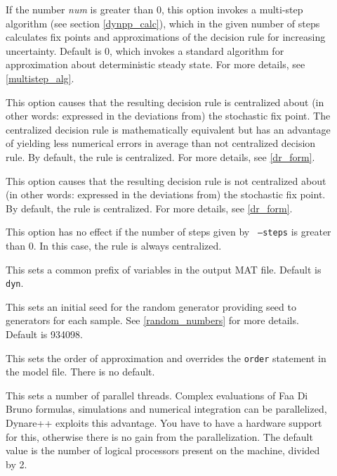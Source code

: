 \documentclass[10pt]{article}
\begin{document}
\begin{description}
\item[] If the number {\it num} is greater
than 0, this option invokes a multi-step algorithm (see section
\ref{dynpp_calc}), which in the given number of steps calculates fix
points and approximations of the decision rule for increasing
uncertainty. Default is 0, which invokes a standard algorithm for
approximation about deterministic steady state. For more details,
see \ref{multistep_alg}.

\item[] This option causes that the resulting
decision rule is centralized about (in other words: expressed in the
deviations from) the stochastic fix point. The centralized decision
rule is mathematically equivalent but has an advantage of yielding
less numerical errors in average than not centralized decision
rule. By default, the rule is centralized. For more details, see
\ref{dr_form}.

\item[] This option causes that the
resulting decision rule is not centralized about (in other words:
expressed in the deviations from) the stochastic fix point. By
default, the rule is centralized. For more details, see
\ref{dr_form}.

This option has no effect if the number of steps given by {\tt
--steps} is greater than 0. In this case, the rule is always
centralized.

\item[] This sets a common prefix of
variables in the output MAT file. Default is {\tt dyn}.

\item[] This sets an initial seed for the
random generator providing seed to generators for each sample. See
\ref{random_numbers} for more details. Default is 934098.

\item[] This sets the order of approximation
and overrides the {\tt order} statement in the model file. There is no
default.

\item[] This sets a number of parallel
threads. Complex evaluations of Faa Di Bruno formulas, simulations and
numerical integration can be parallelized, Dynare++ exploits this
advantage. You have to have a hardware support for this, otherwise
there is no gain from the parallelization. The default value is the number of
logical processors present on the machine, divided by 2.


\end{description}
\end{document}
